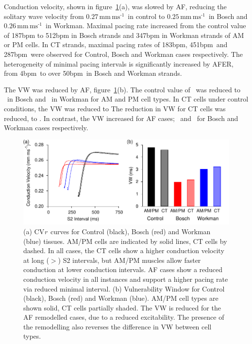Conduction velocity, shown in figure~\ref{fig:toolkit:afer:cvr}(a), was slowed by AF,
reducing the solitary wave velocity from $0.27\,\text{mm}\,\text{ms}^{\text{-1}}$\ in
control to $0.25\,\text{mm}\,\text{ms}^{\text{-1}}$\ in Bosch and
$0.26\,\text{mm}\,\text{ms}^{\text{-1}}$\ in
Workman.
Maximal pacing rate increased from the control value of \unit{187}{bpm} to
\unit{512}{bpm} in Bosch strands and \unit{347}{bpm} in Workman strands of AM or
PM cells.
In CT strands, maximal pacing rates of \unit{183}{bpm}, \unit{451}{bpm}\ and
\unit{287}{bpm}\ were observed for Control, Bosch and Workman cases
respectively.
The heterogeneity of minimal pacing intervals is significantly increased by
AFER, from \unit{4}{bpm}\ to over \unit{50}{bpm}\ in Bosch and Workman strands.

The VW was reduced by AF, figure~\ref{fig:toolkit:afer:cvr}(b).
The control value of \ was reduced to \ in Bosch and \ in Workman for AM and PM cell types.
In CT cells under control conditions, the VW was reduced to \ms{}
The reduction in VW for CT cells was reduced, to .
In contrast, the VW increased for AF cases; \ and \ for Bosch
and Workman cases respectively.


\begin{figure}
\centering
\includegraphics{figures/toolkit/afer/figures/03_CVR}
\caption[AFER CVr curves and VWs]{
\label{fig:toolkit:afer:cvr}
(a) 
CV\emph{r}\ curves for Control (black), Bosch (red) and Workman (blue) tissues.
AM/PM cells are indicated by solid lines, CT cells by dashed.
In all cases, the CT cells show a higher conduction velocity at long
($>$) S2 intervals, but AM/PM muscles allow faster conduction at lower
conduction intervals.
AF cases show a reduced conduction velocity in all instances and support a
higher pacing rate via reduced minimal interval.
(b) Vulnerability Window for Control (black), Bosch (red) and Workman (blue).
AM/PM cell types are shown solid, CT cells partially shaded.
The VW is reduced for the AF remodelled cases, due to a reduced excitability.
The presence of the remodelling also reverses the difference in VW between cell
types.
}
\end{figure}

